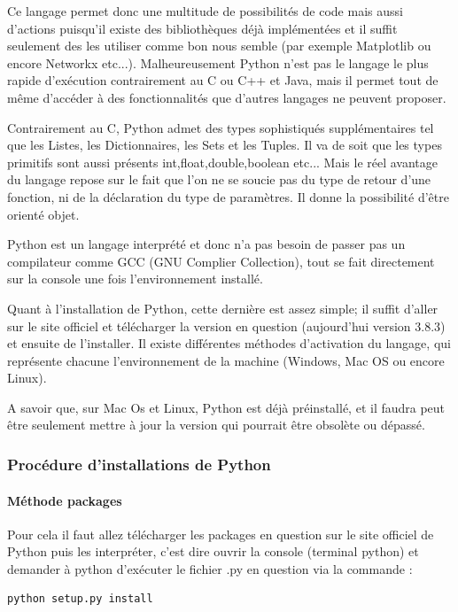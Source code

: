 \documentclass[a4paper, 12pt, twoside]{article}
\begin{document}
Ce langage permet donc une multitude de possibilités de code mais aussi d'actions puisqu'il existe des bibliothèques déjà implémentées et il suffit seulement des les utiliser comme bon nous semble (par exemple Matplotlib ou encore Networkx etc...). Malheureusement Python n'est pas le langage le plus rapide d'exécution contrairement au C ou C++ et Java, mais il permet tout de même d'accéder à des fonctionnalités que d'autres langages ne peuvent proposer. \newline

Contrairement au C, Python admet des types sophistiqués supplémentaires tel que les \textsf{Listes}, les \textsf{Dictionnaires}, les \textsf{Sets} et les \textsf{Tuples}. Il va de soit que les types primitifs sont aussi présents \textsf{int,float,double,boolean etc..}. Mais le réel avantage du langage repose sur le fait que l'on ne se soucie pas du type de retour d'une fonction, ni de la déclaration du type de paramètres. Il donne la possibilité d'être orienté objet. \newline

Python est un langage interprété et donc n'a pas besoin de passer pas un compilateur comme GCC (GNU Complier Collection), tout se fait directement sur la console une fois l'environnement installé. \newline

Quant à l'installation de Python, cette dernière est assez simple; il suffit d'aller sur le site officiel et télécharger la version en question (aujourd'hui version 3.8.3) et ensuite de l'installer. Il existe différentes méthodes d'activation du langage, qui représente chacune l'environnement de la machine (Windows, Mac OS ou encore Linux).\newline

A savoir que, sur Mac Os et Linux, Python est déjà préinstallé, et il faudra peut être seulement mettre à jour la version qui pourrait être obsolète ou dépassé.

\subsubsection{Procédure d'installations de Python} 
\paragraph{Méthode packages}{Pour cela il faut allez télécharger les packages en question sur le site officiel de Python puis les interpréter, c'est dire ouvrir la console (terminal python) et demander à python d'exécuter le fichier \textsf{.py} en question via la commande :}
\begin{verbatim}
python setup.py install
\end{verbatim} 
\end{document}
